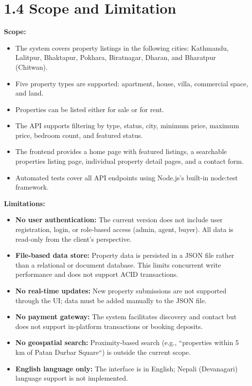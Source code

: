 \documentclass[12pt,a4paper]{report}
\begin{document}
\section{1.4 Scope and Limitation}
\textbf{Scope:}

\begin{itemize}
  \item \textbullet{} The system covers property listings in the following cities: Kathmandu, Lalitpur, Bhaktapur, Pokhara, Biratnagar, Dharan, and Bharatpur (Chitwan).
  \item \textbullet{} Five property types are supported: apartment, house, villa, commercial space, and land.
  \item \textbullet{} Properties can be listed either for sale or for rent.
  \item \textbullet{} The API supports filtering by type, status, city, minimum price, maximum price, bedroom count, and featured status.
  \item \textbullet{} The frontend provides a home page with featured listings, a searchable properties listing page, individual property detail pages, and a contact form.
  \item \textbullet{} Automated tests cover all API endpoints using Node.js's built-in node:test framework.
\end{itemize}
\textbf{Limitations:}

\begin{itemize}
  \item \textbullet{} \textbf{No user authentication:} The current version does not include user registration, login, or role-based access (admin, agent, buyer). All data is read-only from the client's perspective.
  \item \textbullet{} \textbf{File-based data store:} Property data is persisted in a JSON file rather than a relational or document database. This limits concurrent write performance and does not support ACID transactions.
  \item \textbullet{} \textbf{No real-time updates:} New property submissions are not supported through the UI; data must be added manually to the JSON file.
  \item \textbullet{} \textbf{No payment gateway:} The system facilitates discovery and contact but does not support in-platform transactions or booking deposits.
  \item \textbullet{} \textbf{No geospatial search:} Proximity-based search (e.g., ``properties within 5 km of Patan Durbar Square``) is outside the current scope.
  \item \textbullet{} \textbf{English language only:} The interface is in English; Nepali (Devanagari) language support is not implemented.
\end{itemize}
\end{document}
